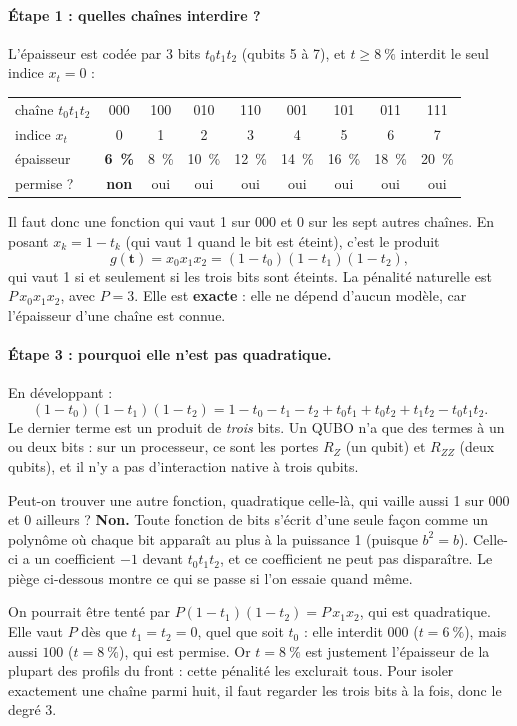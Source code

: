 \paragraph{Étape 1 : quelles chaînes interdire ?} L'épaisseur est codée par 3 bits $t_0t_1t_2$ (qubits 5 à 7), et $t\ge8~\%$ interdit le seul indice $x_t=0$ :
\begin{center}
\renewcommand{\arraystretch}{1.15}
\small
\begin{tabular}{l*{8}{c}}
\toprule
chaîne $t_0t_1t_2$ & 000 & 100 & 010 & 110 & 001 & 101 & 011 & 111 \\
indice $x_t$ & 0 & 1 & 2 & 3 & 4 & 5 & 6 & 7 \\
épaisseur & \textbf{6~\%} & 8~\% & 10~\% & 12~\% & 14~\% & 16~\% & 18~\% & 20~\% \\
permise ? & \textbf{non} & oui & oui & oui & oui & oui & oui & oui \\
\bottomrule
\end{tabular}
\end{center}
Il faut donc une fonction qui vaut 1 sur $000$ et 0 sur les sept autres chaînes. En posant $x_k=1-t_k$ (qui vaut 1 quand le bit est éteint), c'est le produit
\[ g(\mathbf t)=x_0x_1x_2=(1-t_0)(1-t_1)(1-t_2), \]
qui vaut 1 si et seulement si les trois bits sont éteints. La pénalité naturelle est $P\,x_0x_1x_2$, avec $P=3$. Elle est \textbf{exacte} : elle ne dépend d'aucun modèle, car l'épaisseur d'une chaîne est connue.

\paragraph{Étape 3 : pourquoi elle n'est pas quadratique.} En développant :
\[ (1-t_0)(1-t_1)(1-t_2)=1-t_0-t_1-t_2+t_0t_1+t_0t_2+t_1t_2-\boxed{t_0t_1t_2}. \]
Le dernier terme est un produit de \emph{trois} bits. Un QUBO n'a que des termes à un ou deux bits : sur un processeur, ce sont les portes $R_Z$ (un qubit) et $R_{ZZ}$ (deux qubits), et il n'y a pas d'interaction native à trois qubits.

Peut-on trouver une autre fonction, quadratique celle-là, qui vaille aussi 1 sur $000$ et 0 ailleurs ? \textbf{Non.} Toute fonction de bits s'écrit d'une seule façon comme un polynôme où chaque bit apparaît au plus à la puissance 1 (puisque $b^2=b$). Celle-ci a un coefficient $-1$ devant $t_0t_1t_2$, et ce coefficient ne peut pas disparaître. Le piège ci-dessous montre ce qui se passe si l'on essaie quand même.

\begin{piege}
On pourrait être tenté par $P(1-t_1)(1-t_2)=P\,x_1x_2$, qui est quadratique. Elle vaut $P$ dès que $t_1=t_2=0$, quel que soit $t_0$ : elle interdit $000$ ($t=6~\%$), mais aussi $100$ ($t=8~\%$), qui est permise. Or $t=8~\%$ est justement l'épaisseur de la plupart des profils du front : cette pénalité les exclurait tous. Pour isoler exactement une chaîne parmi huit, il faut regarder les trois bits à la fois, donc le degré 3.
\end{piege}

